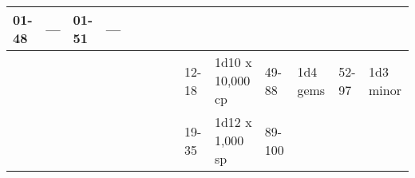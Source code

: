 \begin{longtable}{llllllllllllll}
{\begin{minipage}[t]{0.923in}
01-48\end{minipage}} & \multicolumn{1}{p{0.469in}|}{\begin{minipage}[t]{0.469in}\raggedright
---\end{minipage}} & \multicolumn{1}{p{0.626in}|}{\begin{minipage}[t]{0.626in}\raggedright
01-51\end{minipage}} & \multicolumn{1}{p{0.469in}|}{\begin{minipage}[t]{0.469in}\centering
---\end{minipage}}\\
\hline
\multicolumn{8}{p{1.150in}|}{\begin{minipage}[t]{1.150in}\centering
\end{minipage}} & \multicolumn{1}{|p{0.393in}|}{\begin{minipage}[t]{0.393in}\raggedright
12-18\end{minipage}} & \multicolumn{1}{p{0.469in}|}{\begin{minipage}[t]{0.469in}\raggedright
1d10 x 10,000 cp\end{minipage}} & \multicolumn{1}{p{0.923in}|}{\begin{minipage}[t]{0.923in}\raggedright
49-88\end{minipage}} & \multicolumn{1}{p{0.469in}|}{\begin{minipage}[t]{0.469in}\raggedright
1d4 gems\end{minipage}} & \multicolumn{1}{p{0.626in}|}{\begin{minipage}[t]{0.626in}\raggedright
52-97\end{minipage}} & \multicolumn{1}{p{0.469in}|}{\begin{minipage}[t]{0.469in}\centering
1d3 minor\end{minipage}}\\
\hline
\multicolumn{8}{p{1.150in}|}{\begin{minipage}[t]{1.150in}\centering
\end{minipage}} & \multicolumn{1}{|p{0.393in}|}{\begin{minipage}[t]{0.393in}\raggedright
19-35\end{minipage}} & \multicolumn{1}{p{0.469in}|}{\begin{minipage}[t]{0.469in}\raggedright
1d12 x 1,000 sp\end{minipage}} & \multicolumn{1}{p{0.923in}|}{\begin{minipage}[t]{0.923in}\raggedright
89-100\end{minipage}} & \multicolumn{1}{p{0.469in}|}{\begin{minipage}[t]{0.469in}\raggedright

\end{minipage}}
\end{longtable}
